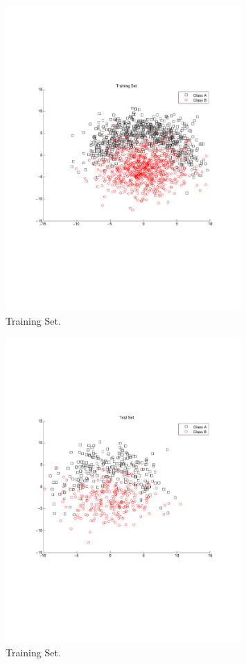 \documentclass[letterpaper,11pt]{article}
\begin{document}
 \begin{figure}[h!]
\centering
  \includegraphics[trim = 0cm 7cm 0cm 7cm, clip, width=0.8\textwidth]{figures/TrainingSet.pdf}
  \caption{Training Set.}
  \label{fig:1}
\end{figure}
 
  \begin{figure}[t!]
\centering
  \includegraphics[trim = 0cm 7cm 0cm 7cm, clip, width=0.8\textwidth]{figures/TestSet.pdf}
  \caption{Training Set.}
  \label{fig:2}
\end{figure}
\end{document}
